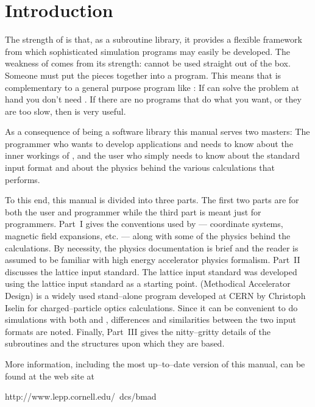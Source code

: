\section*{Introduction}

The strength of \bmad is that, as a subroutine library, it provides a
flexible framework from which sophisticated simulation programs may
easily be developed.  The weakness of \bmad comes from its strength:
\bmad cannot be used straight out of the box. Someone must put the
pieces together into a program. This means that \bmad is
complementary to a general purpose program like
\mad\cite{b:maduser,b:madphysics}: If \mad can solve the problem at
hand you don't need \bmad. If there are no programs that do what you
want, or they are too slow, then \bmad is very useful.

As a consequence of \bmad being a software library this manual serves
two masters: The programmer who wants to develop applications and
needs to know about the inner workings of \bmad, and the user who
simply needs to know about the \bmad standard input format and about
the physics behind the various calculations that \bmad performs.

To this end, this manual is divided into three parts. The first two
parts are for both the user and programmer while the third part is
meant just for programmers. Part~I gives the conventions used by
\bmad --- coordinate systems, magnetic field expansions, etc. ---
along with some of the physics behind the calculations. By necessity,
the physics documentation is brief and the reader is assumed to be familiar
with high energy accelerator physics formalism. Part~II discusses the
\bmad lattice input standard.  The \bmad lattice input standard was
developed using the \mad lattice input standard as a starting
point. \mad (Methodical Accelerator Design) is a widely used
stand--alone program developed at CERN by Christoph Iselin for
charged--particle optics calculations. Since it can be convenient
to do simulations with both \mad and \bmad, differences and
similarities between the two input formats are noted. 
Finally, Part~III gives the nitty--gritty details of the \bmad
subroutines and the structures upon which they are based.

More information, including the most up--to--date version of this
manual, can be found at the \bmad web site at
\begin{example}
  http://www.lepp.cornell.edu/~dcs/bmad
\end{example}

